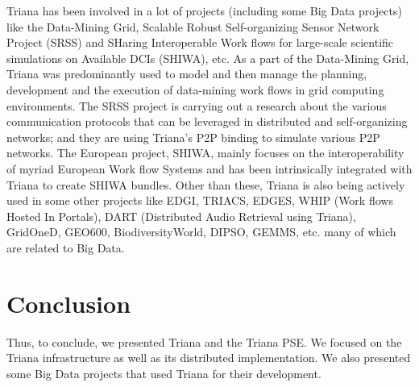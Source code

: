\documentclass[9pt,twocolumn,twoside]{styles/osajnl}
\begin{document}
\cite{Triana-projects} Triana has been involved in a lot of projects
(including some Big Data projects) like the
\cite{Triana-Data-Mining-Grid} Data-Mining Grid, \cite{Triana-SRSS}
Scalable Robust Self-organizing Sensor Network Project (SRSS) and
\cite{Triana-SHIWA} SHaring Interoperable Work flows for large-scale
scientific simulations on Available DCIs (SHIWA), etc.  As a part of
the Data-Mining Grid, Triana was predominantly used to model and then
manage the planning, development and the execution of data-mining work
flows in grid computing environments.  \cite{Triana-SRSS} The SRSS
project is carrying out a research about the various communication
protocols that can be leveraged in distributed and self-organizing
networks; and they are using Triana's P2P binding to simulate various
P2P networks.  The European project, SHIWA, mainly focuses on the
interoperability of myriad European Work flow Systems and has been
intrinsically integrated with Triana to create \cite{Triana-SHIWA}
SHIWA bundles.  Other than these, Triana is also being actively used
in some other projects like EDGI, TRIACS, EDGES, WHIP (Work flows
Hosted In Portals), DART (Distributed Audio Retrieval using Triana),
GridOneD, GEO600, BiodiversityWorld, DIPSO, GEMMS, etc. many of which
are related to Big Data.

\section{Conclusion}

Thus, to conclude, we presented Triana and the Triana PSE.  We focused
on the Triana infrastructure as well as its distributed
implementation.  We also presented some Big Data projects that used
Triana for their development.



\end{document}
